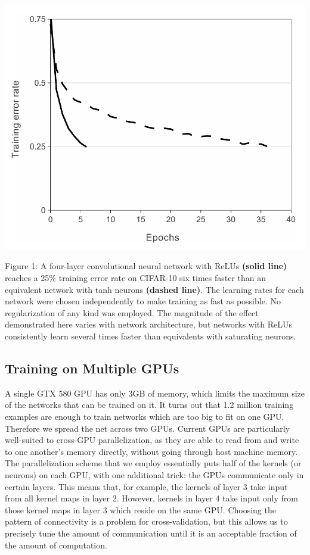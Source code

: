 \documentclass[12pt,a4paper,UTF8,twoside]{book}
\begin{document}
\begin{center}\includegraphics[width=0.7\linewidth]{img/01-01} \end{center}

Figure 1: A four-layer convolutional neural network with ReLUs \textbf{(solid line)} reaches a 25\% training error rate on CIFAR-10 six times faster than an equivalent network with tanh neurons \textbf{(dashed line)}. The learning rates for each network were chosen independently to make training as fast as possible. No regularization of any kind was employed. The magnitude of the effect demonstrated here varies with network architecture, but networks with ReLUs consistently learn several times faster than equivalents with saturating neurons.

\hypertarget{training-on-multiple-gpus}{%
\subsection{Training on Multiple GPUs}\label{training-on-multiple-gpus}}

A single GTX 580 GPU has only 3GB of memory, which limits the maximum size of the networks that can be trained on it. It turns out that 1.2 million training examples are enough to train networks which are too big to fit on one GPU. Therefore we spread the net across two GPUs. Current GPUs are particularly well-suited to cross-GPU parallelization, as they are able to read from and write to one another's memory directly, without going through host machine memory. The parallelization scheme that we employ essentially puts half of the kernels (or neurons) on each GPU, with one additional trick: the GPUs communicate only in certain layers. This means that, for example, the kernels of layer 3 take input from all kernel maps in layer 2. However, kernels in layer 4 take input only from those kernel maps in layer 3 which reside on the same GPU. Choosing the pattern of connectivity is a problem for cross-validation, but this allows us to precisely tune the amount of communication until it is an acceptable fraction of the amount of computation.
\end{document}
